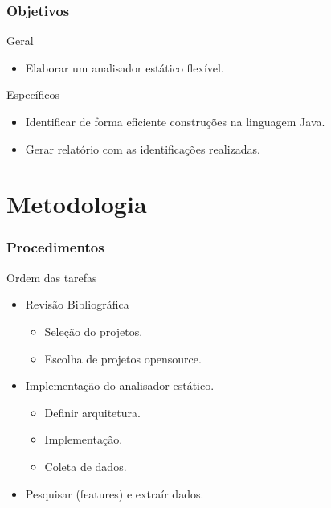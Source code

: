 \documentclass[]{beamer}
\begin{document}
	
	\begin{frame}[fragile]\frametitle{Objetivos}
		\begin{block}{Geral}
			\begin{itemize}
				\item Elaborar um analisador estático flexível.
			\end{itemize}
		\end{block}
			
			\begin{block}{Específicos}
				\begin{itemize}
					\item Identificar de forma eficiente construções na linguagem Java.
					
					\item Gerar relatório com as identificações realizadas.
				\end{itemize}
			\end{block}
	\end{frame}
	
	\section{Metodologia}
	\begin{frame}[label=metodologia, fragile]
		\frametitle{Procedimentos}
		\begin{block}{Ordem das tarefas}
			\begin{itemize}
				\item Revisão Bibliográfica
					\begin{itemize}
						\item Seleção do projetos.
						\item Escolha de projetos opensource.
					\end{itemize}
				\item Implementação do analisador estático.
					\begin{itemize}
						\item Definir arquitetura.
						\item Implementação.
						\item Coleta de dados.
					\end{itemize}
			
				\item Pesquisar (features) e extraír dados.
			\end{itemize}
		\end{block}
	\end{frame}
	
\end{document}
